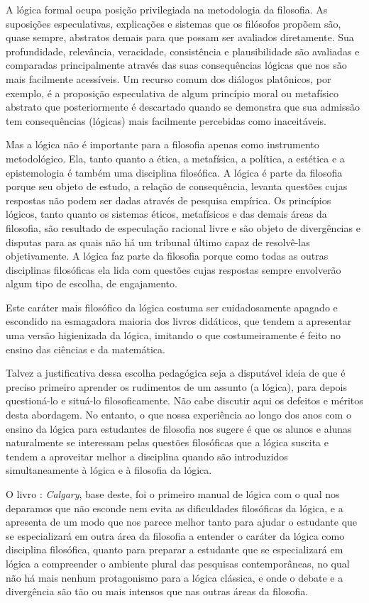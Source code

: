 A lógica formal ocupa posição privilegiada na metodologia da filosofia. 
As suposições especulativas, explicações e sistemas que os filósofos propõem  são, quase sempre, abstratos demais para que possam ser avaliados diretamente. 
Sua profundidade, relevância, veracidade, consistência e plausibilidade são avaliadas e comparadas principalmente através das suas consequências lógicas que nos são mais facilmente acessíveis.
Um recurso comum dos diálogos platônicos, por exemplo, é a proposição especulativa de algum princípio moral ou metafísico abstrato que posteriormente é descartado quando se demonstra que sua admissão tem consequências (lógicas) mais facilmente percebidas como inaceitáveis.

Mas a lógica não é importante para a filosofia apenas como instrumento metodológico.
Ela, tanto quanto a ética, a metafísica, a política, a estética e a epistemologia é também uma disciplina filosófica.
A lógica é parte da filosofia porque seu objeto de estudo, a relação de consequência, levanta questões cujas respostas não podem ser dadas através de pesquisa empírica.
Os princípios lógicos, tanto quanto os sistemas éticos, metafísicos e das demais áreas da filosofia, são resultado de especulação racional livre e são objeto de divergências e disputas para as quais não há um tribunal último capaz de resolvê-las objetivamente.
A lógica faz parte da filosofia porque como todas as outras disciplinas filosóficas ela lida com questões cujas respostas sempre envolverão algum tipo de escolha, de engajamento.

Este caráter mais filosófico da lógica costuma ser cuidadosamente apagado e escondido na esmagadora maioria dos livros didáticos, que tendem a apresentar uma versão higienizada da lógica, imitando o que costumeiramente é feito no ensino das ciências e da matemática.

Talvez a justificativa dessa escolha pedagógica seja a disputável ideia de que é preciso  primeiro aprender os rudimentos de um assunto (a lógica), para depois questioná-lo e situá-lo filosoficamente.
Não cabe discutir aqui os defeitos e méritos desta abordagem. 
No entanto, o que nossa experiência ao longo dos anos com o ensino da lógica para estudantes de filosofia nos sugere é que os alunos e alunas naturalmente se interessam pelas questões filosóficas que a lógica suscita e tendem a aproveitar melhor a disciplina quando são introduzidos simultaneamente à lógica e à filosofia da lógica.

O livro \forallx: \emph{Calgary}, base deste, foi o primeiro manual de lógica com o qual nos deparamos que não esconde nem evita as dificuldades filosóficas da lógica, e a apresenta de um modo que nos parece melhor tanto para ajudar o estudante que se especializará em outra área da filosofia a entender o caráter da lógica como disciplina filosófica, quanto para preparar a estudante que se especializará em lógica a compreender o ambiente plural das pesquisas contemporâneas, no qual não há mais nenhum protagonismo para a lógica clássica, e onde o debate e a divergência são tão ou mais intensos que nas outras áreas da filosofia.

